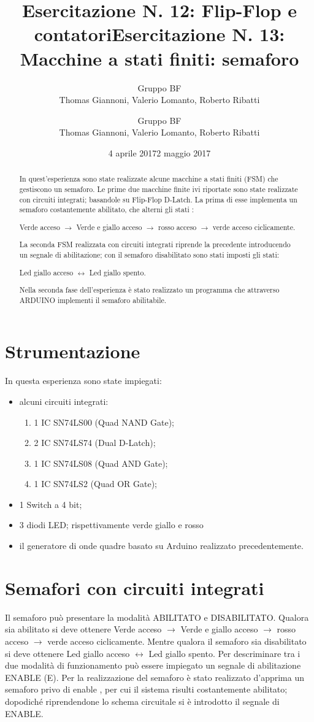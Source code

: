 \documentclass[a4paper,11pt]{article}
\author{Gruppo BF \\ Thomas Giannoni, Valerio Lomanto, Roberto Ribatti}
\title{Esercitazione N. 12: Flip-Flop e contatori}
\date{4 aprile 2017}
\author{Gruppo BF \\ Thomas Giannoni, Valerio Lomanto, Roberto Ribatti}
\title{Esercitazione N. 13: Macchine a stati finiti: semaforo }
\date{2 maggio 2017}
\begin{document}
\maketitle
\begin{abstract}
In quest'esperienza sono state realizzate  alcune macchine a stati finiti (FSM) che 
gestiscono un semaforo.
Le prime due macchine finite ivi riportate sono state realizzate con circuiti integrati; 
basandole su Flip-Flop D-Latch. La prima di esse implementa un semaforo costantemente abilitato, 
che alterni gli stati : 

Verde acceso $\longrightarrow$ Verde e 
giallo acceso $\longrightarrow$ rosso acceso $\longrightarrow$ 
verde acceso  ciclicamente.

La seconda FSM realizzata con 
circuiti integrati riprende la precedente introducendo un segnale di abilitazione; 
con il semaforo disabilitato sono stati imposti gli stati:

 Led giallo acceso $\leftrightarrow$ Led giallo spento.

Nella seconda fase dell'esperienza è stato realizzato un programma che attraverso ARDUINO
 implementi il semaforo abilitabile.
\end{abstract}

\section{Strumentazione}
	In questa esperienza sono state impiegati:
	\begin{itemize}
		\item alcuni circuiti integrati:
		\begin{enumerate}
			\item 1 IC SN74LS00 (Quad NAND Gate);
			\item 2 IC SN74LS74 (Dual D-Latch);
			\item 1 IC SN74LS08 (Quad AND Gate);
			\item 1 IC SN74LS2 (Quad OR Gate);
		\end{enumerate}
		\item 1 Switch a 4 bit;
		\item 3 diodi LED; rispettivamente verde giallo e rosso
		\item il generatore di onde quadre basato su Arduino realizzato precedentemente.
	\end{itemize}
\section{Semafori con circuiti integrati }
Il semaforo può presentare la modalità ABILITATO e DISABILITATO. Qualora sia abilitato si deve 
ottenere Verde acceso $\longrightarrow$ Verde e 
giallo acceso $\longrightarrow$ rosso acceso $\longrightarrow$ 
verde acceso  ciclicamente. Mentre qualora il semaforo sia disabilitato si deve ottenere
Led giallo acceso $\leftrightarrow$ Led giallo spento.
Per descriminare tra i due modalità di funzionamento può essere impiegato un segnale di abilitazione 
ENABLE (E).
Per la realizzazione del semaforo è stato realizzato d'apprima un semaforo privo di enable , per cui il sistema risulti costantemente abilitato;
dopodiché riprendendone lo schema circuitale si è introdotto il segnale di ENABLE.
\end{document}

